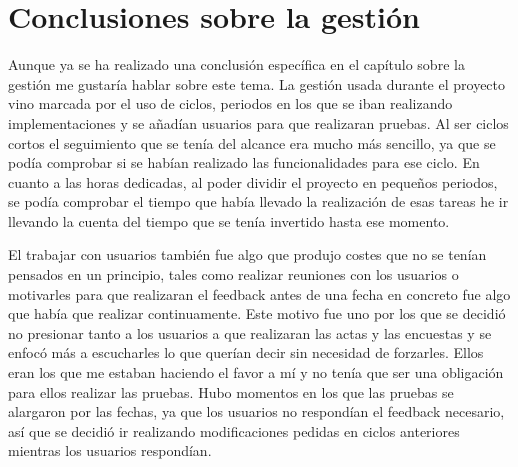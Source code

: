 \section{Conclusiones sobre la gestión}
\label{secc:Conclusiones sobre la gestión}

Aunque ya se ha realizado una conclusión específica en el capítulo sobre la gestión me gustaría hablar sobre este tema. La gestión usada durante el proyecto vino marcada por el uso de ciclos, periodos en los que se iban realizando implementaciones y se añadían usuarios para que realizaran pruebas. Al ser ciclos cortos el seguimiento que se tenía del alcance era mucho más sencillo, ya que se podía comprobar si se habían realizado las funcionalidades para ese ciclo. En cuanto a las horas dedicadas, al poder dividir el proyecto en pequeños periodos, se podía comprobar el tiempo que había llevado la realización de esas tareas he ir llevando la cuenta del tiempo que se tenía invertido hasta ese momento. 

El trabajar con usuarios también fue algo que produjo costes que no se tenían pensados en un principio, tales como realizar reuniones con los usuarios o motivarles para que realizaran el feedback antes de una fecha en concreto fue algo que había que realizar continuamente. Este motivo fue uno por los que se decidió no presionar tanto a los usuarios a que realizaran las actas y las encuestas y se enfocó más a escucharles lo que querían decir sin necesidad de forzarles. Ellos eran los que me estaban haciendo el favor a mí y no tenía que ser una obligación para ellos realizar las pruebas. Hubo momentos en los que las pruebas se alargaron por las fechas, ya que los usuarios no respondían el feedback necesario, así que se decidió ir realizando modificaciones pedidas en ciclos anteriores mientras los usuarios respondían.


